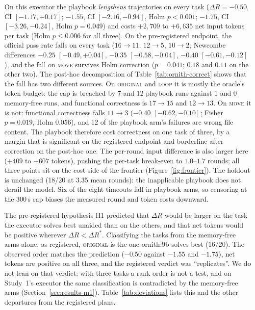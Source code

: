 \documentclass[smallcondensed,natbib]{svjour3}
\begin{document}
On this executor the playbook \emph{lengthens} trajectories on every
task ($\Delta R = -0.50$, CI $[-1.17, +0.17]$; $-1.55$, CI $[-2.16,
-0.94]$, Holm $p<0.001$; $-1.75$, CI $[-3.26, -0.24]$, Holm $p=0.049$)
and costs $+2{,}709$ to $+6{,}635$ net input tokens per task (Holm
$p\leq0.006$ for all three). On the pre-registered endpoint, the
official pass rate falls on every task ($16\to11$, $12\to5$,
$10\to2$; Newcombe differences $-0.25$ $[-0.49, +0.04]$, $-0.35$
$[-0.58, -0.04]$, $-0.40$ $[-0.61, -0.12]$), and the fall on
\textsc{move} survives Holm correction ($p=0.041$; $0.18$ and $0.11$
on the other two). The post-hoc decomposition of
Table~\ref{tab:ornith-correct} shows that the fall has two different
sources. On \textsc{original} and \textsc{loop} it is mostly the
oracle's token budget: the cap is breached by 7 and 12 playbook runs
against 1 and 0 memory-free runs, and functional correctness is
$17\to15$ and $12\to13$. On \textsc{move} it is not: functional
correctness falls $11\to3$ ($-0.40$ $[-0.62, -0.10]$; Fisher
$p=0.019$, Holm $0.056$), and 12 of the playbook arm's failures are
wrong file content. The playbook therefore cost correctness on one
task of three, by a margin that is significant on the registered
endpoint and borderline after correction on the post-hoc one. The
per-round input difference is also larger here ($+409$ to $+607$
tokens), pushing the per-task break-even to $1.0$--$1.7$ rounds; all
three points sit on the cost side of the frontier
(Figure~\ref{fig:frontier}). The
holdout is unchanged (18/20 at 3.35 mean rounds): the inapplicable
playbook does not derail the model. Six of the eight timeouts fall in
playbook arms, so censoring at the 300\,s cap biases the measured round
and token costs downward.

The pre-registered hypothesis H1 predicted that $\Delta R$ would be
larger on the task the executor solves best unaided than on the
others, and that net tokens would be positive wherever $\Delta R <
\Delta R^{*}$. Classifying the tasks from the memory-free arms alone,
as registered, \textsc{original} is the one ornith:9b solves best
($16/20$). The observed order matches the prediction ($-0.50$ against
$-1.55$ and $-1.75$), net tokens are positive on all three, and the
registered verdict was ``replicates''. We do not lean on that
verdict: with three tasks a rank order is not a test, and on Study~1's
executor the same classification is contradicted by the memory-free
arms (Section~\ref{sec:results-m1}). Table~\ref{tab:deviations}
lists this and the other departures from the registered plans.
\end{document}
